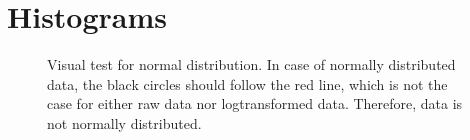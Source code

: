\section{Histograms}


\begin{center}
	\begin{figure}[H]
		\caption[Testing normal distribution]{Visual test for normal distribution. In case of normally distributed data, the black circles should follow the red line, which is not the case for either raw data nor logtransformed data. Therefore, data is not normally distributed.}
		\label{fig:NormDis}
	\end{figure}
\end{center}


